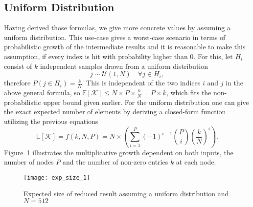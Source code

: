 \documentclass[11pt]{article}
\begin{document}
\subsection{Uniform Distribution}
Having derived those formulas, we give more concrete values by assuming a uniform distribution. This use-case gives a worst-case scenario in terms of probabilistic growth of the intermediate results and it is reasonable to make this assumption, if every index is hit with probability higher than $0$.
For this, let $H_i$ consist of $k$ independent samples drawn from a uniform distribution $$j \sim \mathcal{U}\left(1,N\right) \quad \forall j \in H_i,$$ therefore $P\left(j \in H_i\right) = \frac{k}{N}$. This is independent of the two indices $i$ and $j$ in the above general formula, so $\mathbb{E}[\mathcal{K}] \leq N \times P \times \frac{k}{N} = P \times k$, which fits the non-probabilistic upper bound given earlier. For the uniform distribution one can give the exact expected number of elements by deriving a closed-form function utilizing the previous equations$$\mathbb{E}[\mathcal{K}] = f(k,N,P) = N \times \left(\sum_{i=1}^{P}(-1)^{i-1}{{P}\choose{i}}\left(\frac{k}{N}\right)^i\right).$$ Figure~\ref{fig:ExpSizeUnifDistrib} illustrates the multiplicative growth dependent on both inputs, the number of nodes $P$ and the number of non-zero entries $k$ at each node.

\begin{figure}[htbp]
	\centering
	\texttt{[image: exp\_size\_1]}
	\caption{Expected size of reduced result assuming a uniform distribution and $N=512$}
	\label{fig:ExpSizeUnifDistrib}
\end{figure}


	
\end{document}
